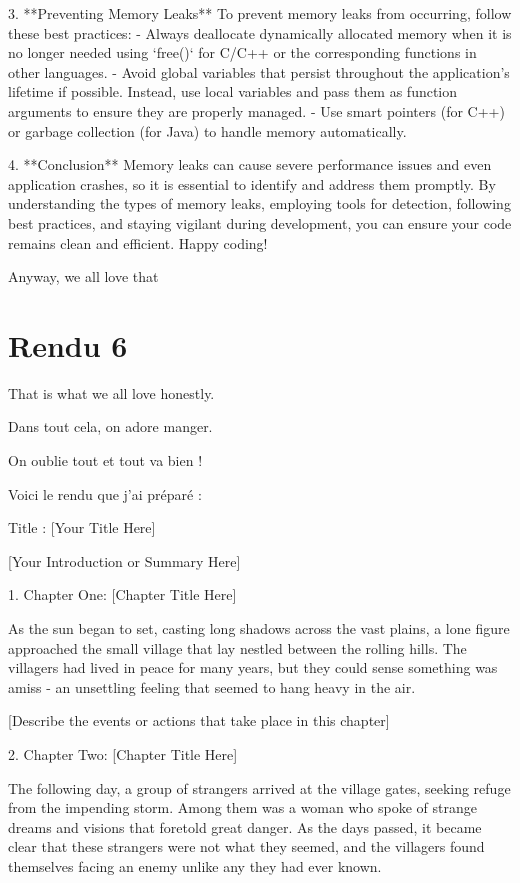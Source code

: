 \documentclass{mytex}
\begin{document}
3. **Preventing Memory Leaks**
   To prevent memory leaks from occurring, follow these best practices:
   - Always deallocate dynamically allocated memory when it is no longer needed using `free()` for C/C++ or the corresponding functions in other languages.
   - Avoid global variables that persist throughout the application's lifetime if possible. Instead, use local variables and pass them as function arguments to ensure they are properly managed.
   - Use smart pointers (for C++) or garbage collection (for Java) to handle memory automatically.

4. **Conclusion**
   Memory leaks can cause severe performance issues and even application crashes, so it is essential to identify and address them promptly. By understanding the types of memory leaks, employing tools for detection, following best practices, and staying vigilant during development, you can ensure your code remains clean and efficient. Happy coding!

Anyway, we all love that

\section{Rendu 6}

That is what we all love honestly.

Dans tout cela, on adore manger.

On oublie tout et tout va bien !

Voici le rendu que j'ai préparé :

Title : [Your Title Here]

[Your Introduction or Summary Here]

1. Chapter One: [Chapter Title Here]

   As the sun began to set, casting long shadows across the vast plains, a lone figure approached the small village that lay nestled between the rolling hills. The villagers had lived in peace for many years, but they could sense something was amiss - an unsettling feeling that seemed to hang heavy in the air.

   [Describe the events or actions that take place in this chapter]

2. Chapter Two: [Chapter Title Here]

   The following day, a group of strangers arrived at the village gates, seeking refuge from the impending storm. Among them was a woman who spoke of strange dreams and visions that foretold great danger. As the days passed, it became clear that these strangers were not what they seemed, and the villagers found themselves facing an enemy unlike any they had ever known.
\end{document}
